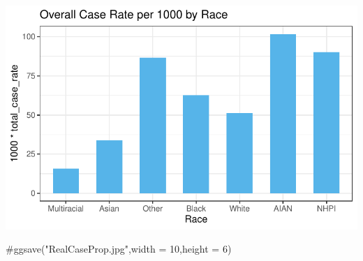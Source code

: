 \documentclass[
  letterpaper,
  DIV=11,
  numbers=noendperiod]{scrartcl}
\newenvironment{Shaded}{\begin{snugshade}}{\end{snugshade}}
\newcommand{\CommentTok}[1]{\textcolor[rgb]{0.37,0.37,0.37}{#1}}
\begin{document}
\includegraphics{StatsForFinalCSV_files/figure-pdf/unnamed-chunk-16-2.pdf}

\begin{Shaded}
\begin{Highlighting}[]
\CommentTok{\#ggsave("RealCaseProp.jpg",width = 10,height = 6)}
\end{Highlighting}
\end{Shaded}
\end{document}

